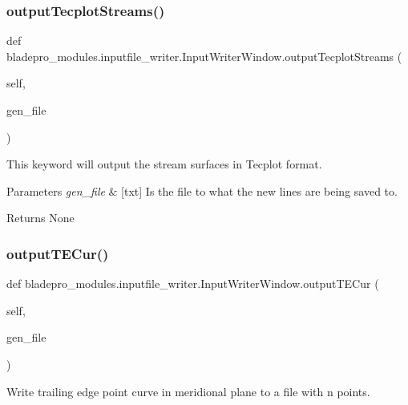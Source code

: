 \subsubsection{\texorpdfstring{output\+Tecplot\+Streams()}{outputTecplotStreams()}}
{\footnotesize\ttfamily def bladepro\+\_\+modules.\+inputfile\+\_\+writer.\+Input\+Writer\+Window.\+output\+Tecplot\+Streams (\begin{DoxyParamCaption}\item[{}]{self,  }\item[{}]{gen\+\_\+file }\end{DoxyParamCaption})}



This keyword will output the stream surfaces in Tecplot format. 


\begin{DoxyParams}{Parameters}
{\em gen\+\_\+file} & \mbox{[}txt\mbox{]} Is the file to what the new lines are being saved to. \\
\hline
\end{DoxyParams}
\begin{DoxyReturn}{Returns}
None 
\end{DoxyReturn}
\hypertarget{classbladepro__modules_1_1inputfile__writer_1_1_input_writer_window_a93fdb47e6f9162ce3fe7ef624f7681aa}{}\label{classbladepro__modules_1_1inputfile__writer_1_1_input_writer_window_a93fdb47e6f9162ce3fe7ef624f7681aa} 
\subsubsection{\texorpdfstring{output\+T\+E\+Cur()}{outputTECur()}}
{\footnotesize\ttfamily def bladepro\+\_\+modules.\+inputfile\+\_\+writer.\+Input\+Writer\+Window.\+output\+T\+E\+Cur (\begin{DoxyParamCaption}\item[{}]{self,  }\item[{}]{gen\+\_\+file }\end{DoxyParamCaption})}



Write trailing edge point curve in meridional plane to a file with n points. 

